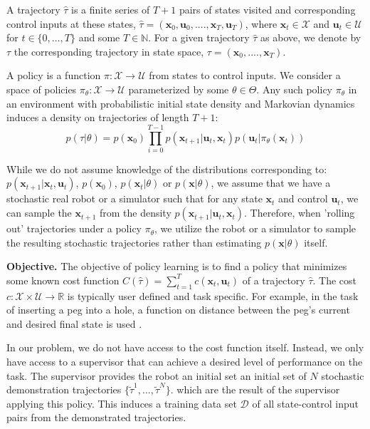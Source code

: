 \documentclass[10pt, conference]{ieeeconf}      %
\newcommand{\bu}{\mathbf{u}}
\newcommand{\bx}{\mathbf{x}}
\begin{document}
A trajectory $\hat{\tau}$ is a finite series of $T+1$ pairs of states visited and corresponding
control inputs at these states, $\hat{\tau} = (\mathbf{x}_0,\mathbf{u}_0, ...., \mathbf{x}_T,\mathbf{u}_T)$, where $\bx_t\in \mathcal{X}$
and $\bu_t\in \mathcal{U}$ for $t\in \{0, \ldots, T\}$ and some $T\in \mathbb{N}$.  
For a given trajectory $\hat{\tau}$ as above, we denote by ${\tau}$ the corresponding trajectory in state space,
${\tau} = (\bx_0,....,\bx_T)$.


A policy is a function $\pi: \mathcal{X} \to \mathcal{U}$ from states to control inputs. 
We consider a space of policies $\pi_{\theta}:\mathcal{X}\to \mathcal{U}$ parameterized by some $\theta\in \Theta$. Any such policy $\pi_{\theta}$ in an environment with probabilistic initial state density and Markovian dynamics
induces a density on trajectories of length $T+1$: $$p(\tau | \theta)=
p(\bx_0)\prod_{i=0}^{T-1}p(\bx_{t+1}|\bu_t,\bx_t)p(\bu_t|\pi_{\theta}(\bx_t))$$


While we do not assume knowledge of the distributions corresponding to: $p(\bx_{t+1}|\bx_t,\bu_t)$, $p(\bx_0)$, $p(\bx_t|
\theta)$ or $p(\bx|\theta)$, we assume that we have a stochastic real robot or a simulator such that for any state
$\bx_t$ and control $\bu_t$, we can sample the $\bx_{t+1}$ from the density $p(\bx_{t+1}|\bu_t,\bx_t)$. 
Therefore, when 'rolling out' trajectories under a policy
$\pi_{\theta}$, we utilize the robot or a simulator to sample the resulting stochastic trajectories rather than
estimating $p(\bx|\theta)$ itself.


\noindent\textbf{Objective.} The objective of  policy learning is to find a policy that minimizes some known cost function $C(\hat{\tau}) = \sum^T_{t=1} c(\bx_t,\bu_t)$ of a trajectory $\hat{\tau}$. The cost $c:\mathcal{X}\times \mathcal{U}\to \mathbb{R}$ is typically user defined and task specific. 
For example, in the task of inserting a peg into a hole, a function on distance between the peg's current and desired final state is used \cite{levine2015end}.  

In our problem, we do not have access to the cost function itself. Instead, we only have access to 
a supervisor that can achieve a desired level of performance on the task. The supervisor provides the robot an initial set
an initial set of $N$ stochastic demonstration trajectories $\lbrace \tilde{\tau}^1,...,\tilde{\tau}^N \rbrace$. 
which are the result of the supervisor applying this policy. This induces a training data set $\mathcal{D}$ of all state-control input pairs from the demonstrated trajectories.
\end{document}
